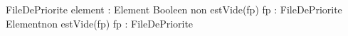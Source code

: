 \begin{algorithme}
        {}{FileDePriorite}{}
        {element : Element}
        {Booleen}{}
        {
        }
        {}
        {
        }
        {non estVide(fp)}
        {fp : FileDePriorite}
        {Element}{non estVide(fp)}
        {fp : FileDePriorite}
        {\naturelNonNul}{}
\end{algorithme}
